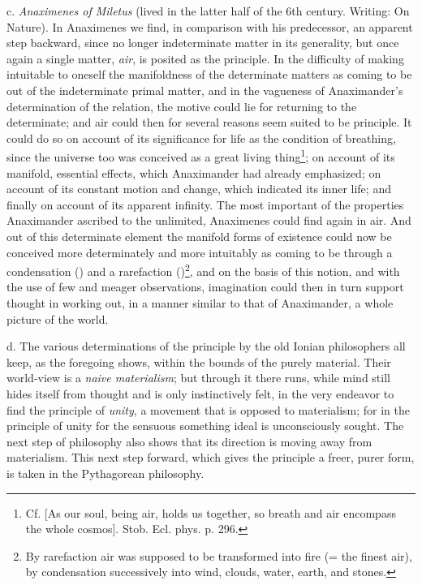 c. \emph{Anaximenes of Miletus} (lived in the latter half of the 6th
century. Writing: On Nature). In Anaximenes we find, in comparison with
his predecessor, an apparent step backward, since no longer
indeterminate matter in its generality, but once again a single matter,
\emph{air}, is posited as the principle. In the difficulty of making
intuitable to oneself the manifoldness of the determinate matters as
coming to be out of the indeterminate primal matter, and in the
vagueness of Anaximander's determination of the relation, the motive
could lie for returning to the determinate; and air could then for
several reasons seem suited to be principle. It could do so on account
of its significance for life as the condition of breathing, since the
universe too was conceived as a great living thing\footnote{Cf.
[As our soul, being air, holds us together, so breath and air encompass
the whole cosmos]. Stob. Ecl. phys. p. 296.}; on account of its
manifold, essential effects, which
\setcounter{footnote}{0}Anaximander had already emphasized;
on account of its constant motion and change, which indicated its inner
life; and finally on account of its apparent infinity. The most
important of the properties Anaximander ascribed to the unlimited,
Anaximenes could find again in air. And out of this determinate element
the manifold forms of existence could now be conceived more
determinately and more intuitably as coming to be through a
condensation () and a rarefaction ()\footnote{By rarefaction air was supposed to be transformed
into fire (= the finest air), by condensation successively into wind,
clouds, water, earth, and stones.}, and on the basis of this notion,
and with the use of few and meager observations, imagination could then
in turn support thought in working out, in a manner similar to that of
Anaximander, a whole picture of the world.

d. The various determinations of the principle by the old Ionian
philosophers all keep, as the foregoing shows, within the bounds of the
purely material. Their world-view is a \emph{naive materialism}; but
through it there runs, while mind still hides itself from thought and
is only instinctively felt, in the very endeavor to find the principle
of \emph{unity}, a movement that is opposed to materialism; for in the
principle of unity for the sensuous something ideal is unconsciously
sought. The next step of philosophy also shows that its direction is
moving away from materialism. This next step forward, which gives the
principle a freer, purer form, is taken in the Pythagorean philosophy.

